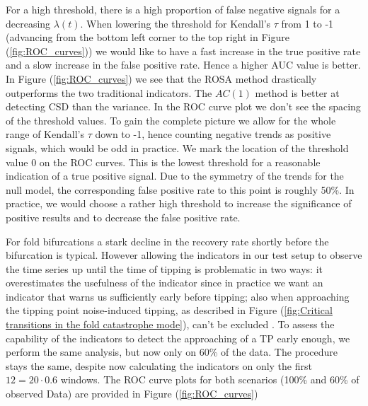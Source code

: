 \documentclass[%
thesis=student,%
coverpage=false,%
titlepage=false,%
headmarks=true, %
english,%
font=libertine, %
math=newpxtx, %
BCOR=5mm,%
coverBCOR=11mm%
]{tumbook}
\begin{document}
For a high threshold, there is a high proportion of false negative signals for a decreasing $\lambda(t)$. When lowering the threshold for Kendall's $\tau$ from 1 to -1 (advancing from the bottom left corner to the top right in Figure (\ref{fig:ROC_curves})) we would like to have a fast increase in the true positive rate and a slow increase in the false positive rate. Hence a higher AUC value is better. In Figure (\ref{fig:ROC_curves}) we see that the ROSA method drastically outperforms the two traditional indicators. The $AC(1)$ method is better at detecting CSD than the variance.  
In the ROC curve plot we don't see the spacing of the threshold values. To gain the complete picture we allow for the whole range of Kendall's $\tau$ down to -1, hence counting negative trends as positive signals, which would be odd in practice. We mark the location of the threshold value 0 on the ROC curves. This is the lowest threshold for a reasonable indication of a true positive signal. Due to the symmetry of the trends for the null model, the corresponding false positive rate to this point is roughly 50\%. In practice, we would choose a rather high threshold to increase the significance of positive results and to decrease the false positive rate.

For fold bifurcations a stark decline in the recovery rate shortly before the bifurcation is typical. However allowing the indicators in our test setup to observe the time series up until the time of tipping is problematic in two ways: it overestimates the usefulness of the indicator since in practice we want an indicator that warns us sufficiently early before tipping; also when approaching the tipping point noise-induced tipping, as described in Figure (\ref{fig:Critical transitions in the fold catastrophe mode}), can't be excluded \cite{Ashwin:2012,Meng:2020}. To assess the capability of the indicators to detect the approaching of a TP early enough, we perform the same analysis, but now only on 60\% of the data. The procedure stays the same, despite now calculating the indicators on only the first $12 = 20 \cdot 0.6$ windows. The ROC curve plots for both scenarios (100\% and 60\% of observed Data) are provided in Figure (\ref{fig:ROC_curves})
\end{document}
